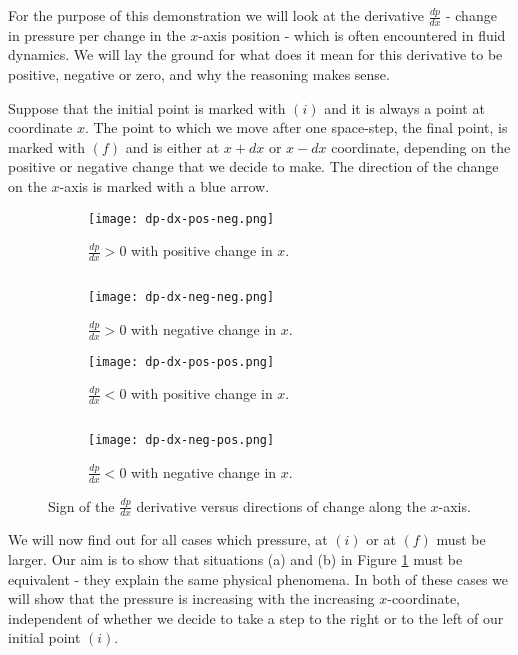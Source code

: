 For the purpose of this demonstration we will look at the derivative $\frac{dp}{dx}$ - change in pressure per change in the $x$-axis position - which is often encountered in fluid dynamics. We will lay the ground for what does it mean for this derivative to be positive, negative or zero, and why the reasoning makes sense.

Suppose that the initial point is marked with \textcolor{myblue}{$(i)$} and it is always a point at coordinate $x$. The point to which we move after one space-step, the final point, is marked with \textcolor{myblue}{$(f)$} and is either at $x+dx$ or $x - dx$ coordinate, depending on the positive or negative change that we decide to make. The direction of the change on the $x$-axis is marked with a blue arrow.

\begin{figure}[H]
\begin{subfigure}[t]{.46\textwidth}
\centering
\texttt{[image: dp-dx-pos-neg.png]}
\caption{$\frac{dp}{dx} > 0$ with positive change in $x$.}
\end{subfigure}
\begin{minipage}[t]{.07\textwidth}
$ $
\vspace*{1.5cm}
\end{minipage}
\begin{subfigure}[t]{.46\textwidth}
\centering
\texttt{[image: dp-dx-neg-neg.png]}
\caption{$\frac{dp}{dx} > 0$ with negative change in $x$.}
\end{subfigure}
\begin{subfigure}[t]{.46\textwidth}
\centering
\texttt{[image: dp-dx-pos-pos.png]}
\caption{$\frac{dp}{dx} < 0$ with positive change in $x$.}
\end{subfigure}
\begin{minipage}[t]{.08\textwidth}
$ $
\end{minipage}
\begin{subfigure}[t]{.46\textwidth}
\centering
\texttt{[image: dp-dx-neg-pos.png]}
\caption{$\frac{dp}{dx} < 0$ with negative change in $x$. }
\end{subfigure}
\caption{Sign of the $\frac{dp}{dx}$ derivative versus directions of change along the $x$-axis.}
\label{fig:dp-dx-signs}
\end{figure}

We will now find out for all cases which pressure, at \textcolor{myblue}{$(i)$} or at \textcolor{myblue}{$(f)$} must be larger. Our aim is to show that situations (a) and (b) in Figure \ref{fig:dp-dx-signs} must be equivalent - they explain the same physical phenomena. In both of these cases we will show that the pressure is increasing with the increasing $x$-coordinate, independent of whether we decide to take a step to the right or to the left of our initial point \textcolor{myblue}{$(i)$}. 

